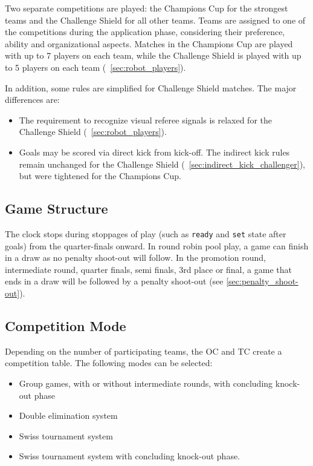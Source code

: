 Two separate competitions are played: the Champions Cup for the strongest teams and the Challenge Shield for all other teams.
Teams are assigned to one of the competitions during the application phase, considering their preference, ability and organizational aspects.
Matches in the Champions Cup are played with up to 7 players on each team, while the Challenge Shield is played with up to 5 players on each team (\cf~\cref{sec:robot_players}).

In addition, some rules are simplified for Challenge Shield matches. The major differences are:
\begin{itemize}
  \item The requirement to recognize visual referee signals is relaxed for the Challenge Shield (\cf~\cref{sec:robot_players}).
  \item Goals may be scored via direct kick from kick-off. The indirect kick rules remain unchanged for the Challenge Shield (\cf~\cref{sec:indirect_kick_challenger}), but were tightened for the Champions Cup.
\end{itemize}

\subsection{Game Structure}

The clock stops during stoppages of play (such as \texttt{ready} and \texttt{set} state after goals) from the quarter-finals onward.
In round robin pool play, a game can finish in a draw as no penalty shoot-out will follow.
In the promotion round, intermediate round, quarter finals, semi finals, 3rd place or final, a game that ends in a draw will be followed by a penalty shoot-out (see \cref{sec:penalty_shoot-out}).

\subsection{Competition Mode}

Depending on the number of participating teams, the OC and TC create a competition table.
The following modes can be selected:
\begin{itemize}
  \item Group games, with or without intermediate rounds, with concluding knock-out phase
  \item Double elimination system
  \item Swiss tournament system
  \item Swiss tournament system with concluding knock-out phase.
\end{itemize}

